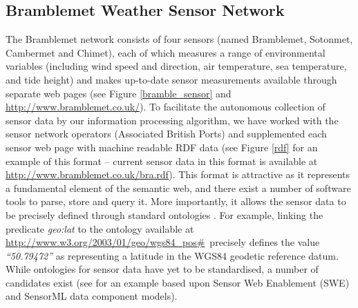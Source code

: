 \documentclass{acmtrans2m}
\begin{document}
\subsection{Bramblemet Weather Sensor Network}

\noindent The Bramblemet network consists of four sensors (named Bramblemet, Sotonmet, Cambermet and Chimet), each of which measures a range of environmental variables (including wind speed and direction, air temperature, sea temperature, and tide height) and makes up-to-date sensor measurements available through separate web pages (see Figure \ref{bramble_sensor} and \small\url{http://www.bramblemet.co.uk/}\normalsize). To facilitate the autonomous collection of sensor data by our information processing algorithm, we have worked with the sensor network operators (Associated British Ports) and supplemented each sensor web page with machine readable RDF data (see Figure \ref{rdf} for an example of this format -- current sensor data in this format is available at \small\url{http://www.bramblemet.co.uk/bra.rdf}\normalsize). This format is attractive as it represents a fundamental element of the semantic web, and there exist a number of software tools to parse, store and query it. More importantly, it allows the sensor data to be precisely defined through standard ontologies \cite{rdf}. For example, linking the predicate {\em geo:lat} to the ontology available at \small\url{http://www.w3.org/2003/01/geo/wgs84_pos#}\normalsize ~precisely defines the value {\em ``50.79472''} as representing a latitude in the WGS84 geodetic reference datum. While ontologies for sensor data have yet to be standardised, a number of candidates exist (see \cite{sensor_rdf} for an example based upon Sensor Web Enablement (SWE) and SensorML data component models).
\end{document}
